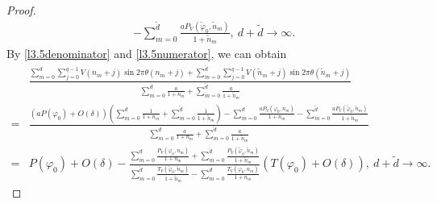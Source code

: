 \documentclass[12pt]{amsart}
\theoremstyle{plain}
\theoremstyle{definition}
\begin{document}
\begin{proof}
\begin{align}
			&-\sum_{m=0}^{\tilde{d}}\frac{aP_V(\tilde{\varphi}_0,\tilde{n}_{m})}{1+\tilde{n}_{m}},\ d+\tilde{d}\to\infty.\nonumber
		\end{align}
		By \eqref{l3.5denominator} and \eqref{l3.5numerator}, we can obtain 
		\begin{align}
			&\frac{\sum_{m=0}^{d}\sum_{j=0}^{q-1}V(n_{m}+j)\sin2\pi\theta(n_{m}+j)+\sum_{m=0}^{\tilde{d}}\sum_{j=0}^{q-1}V(\tilde{n}_{m}+j)\sin2\pi\theta(\tilde{n}_{m}+j)}{\sum_{m=0}^{d}\frac{a}{1+n_{m}}+\sum_{m=0}^{\tilde{d}}\frac{a}{1+\tilde{n}_{m}}}\nonumber\\
			=&\frac{\left(aP(\varphi_0)+O(\delta)\right)\left(\sum_{m=0}^{d}\frac{1}{1+n_{m}}+\sum_{m=0}^{\tilde{d}}\frac{1}{1+\tilde{n}_{m}}\right)-\sum_{m=0}^{d}\frac{aP_V(\varphi_0,n_{m})}{1+n_{m}}
				-\sum_{m=0}^{\tilde{d}}\frac{aP_V(\tilde{\varphi}_0,\tilde{n}_{m})}{1+\tilde{n}_{m}}}{\sum_{m=0}^{d}\frac{a}{1+n_{m}}+\sum_{m=0}^{\tilde{d}}\frac{a}{1+\tilde{n}_{m}}}\nonumber\\
			=&P(\varphi_0)+O(\delta)-\frac{\sum_{m=0}^{d}\frac{P_V(\varphi_0,n_{m})}{1+n_{m}}+\sum_{m=0}^{\tilde{d}}\frac{P_V(\tilde{\varphi}_0,\tilde{n}_{m})}{1+\tilde{n}_{m}}}{{\sum_{m=0}^{\tilde{d}}\frac{T_V(\tilde{\varphi}_0,\tilde{n}_{m})}{1+\tilde{n}_{m}}-\sum_{m=0}^{d}\frac{T_V(\varphi_0,n_{m})}{1+n_{m}}}}(T(\varphi_0)+O(\delta)),\ d+\tilde{d}\to\infty.\label{l3.5middlefinal}
		\end{align}
		

\end{proof}
\end{document}
